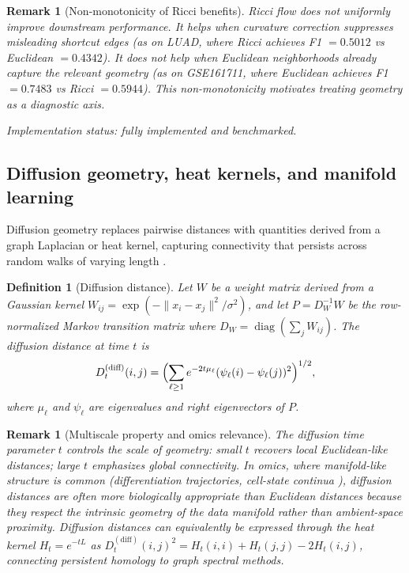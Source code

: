 \documentclass[11pt]{article}
\newtheorem{definition}[theorem]{Definition}
\newtheorem{remark}[theorem]{Remark}
\begin{document}
\begin{remark}[Non-monotonicity of Ricci benefits]\label{rem:ricci_nonmono}
Ricci flow does not uniformly improve downstream performance.
It helps when curvature correction suppresses misleading shortcut edges (as on LUAD, where Ricci achieves F1 $= 0.5012$ vs Euclidean $= 0.4342$).
It does not help when Euclidean neighborhoods already capture the relevant geometry (as on GSE161711, where Euclidean achieves F1 $= 0.7483$ vs Ricci $= 0.5944$).
This non-monotonicity motivates treating geometry as a diagnostic axis.
\end{remark}

\emph{Implementation status: fully implemented and benchmarked.}

\subsection{Diffusion geometry, heat kernels, and manifold learning}
\label{sec:diffusion}

Diffusion geometry replaces pairwise distances with quantities derived from a graph Laplacian or heat kernel, capturing connectivity that persists across random walks of varying length \cite{coifman2006diffusion}.

\begin{definition}[Diffusion distance]\label{def:diffusion}
Let $W$ be a weight matrix derived from a Gaussian kernel $W_{ij} = \exp(-\|x_i - x_j\|^2 / \sigma^2)$, and let $P = D_W^{-1} W$ be the row-normalized Markov transition matrix where $D_W = \operatorname{diag}(\sum_j W_{ij})$.
The \emph{diffusion distance} at time $t$ is
\[
D^{(\text{diff})}_{t}(i,j) = \Bigl( \sum_{\ell \ge 1} e^{-2t\mu_\ell} (\psi_\ell(i) - \psi_\ell(j))^2 \Bigr)^{1/2},
\]
where $\mu_\ell$ and $\psi_\ell$ are eigenvalues and right eigenvectors of $P$.
\end{definition}

\begin{remark}[Multiscale property and omics relevance]\label{rem:diffusion_multiscale}
The diffusion time parameter $t$ controls the scale of geometry: small $t$ recovers local Euclidean-like distances; large $t$ emphasizes global connectivity.
In omics, where manifold-like structure is common (differentiation trajectories, cell-state continua \cite{haghverdi2016}), diffusion distances are often more biologically appropriate than Euclidean distances because they respect the intrinsic geometry of the data manifold rather than ambient-space proximity.
Diffusion distances can equivalently be expressed through the heat kernel $H_t = e^{-tL}$ as $D^{(\text{diff})}_t(i,j)^2 = H_t(i,i) + H_t(j,j) - 2H_t(i,j)$, connecting persistent homology to graph spectral methods.
\end{remark}
\end{document}
